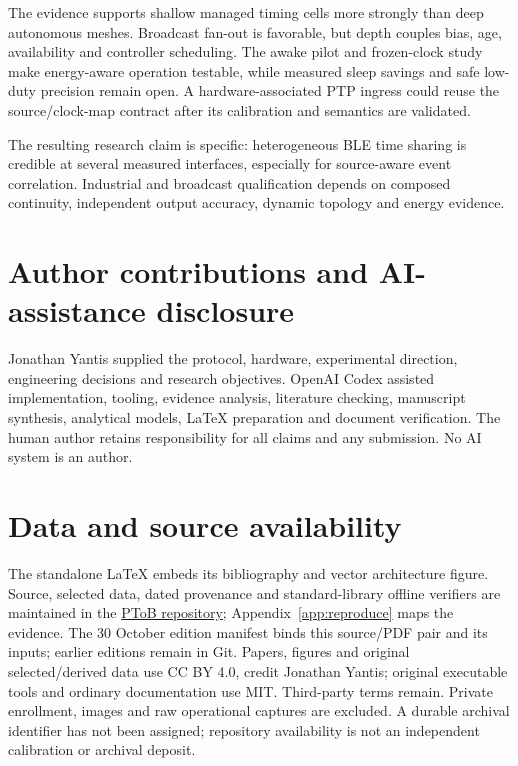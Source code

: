 \documentclass[11pt,letterpaper]{article}
\begin{document}
The evidence supports shallow managed timing cells more strongly than deep autonomous meshes. Broadcast fan-out is favorable, but depth couples bias, age, availability and controller scheduling. The awake pilot and frozen-clock study make energy-aware operation testable, while measured sleep savings and safe low-duty precision remain open. A hardware-associated PTP ingress could reuse the source/clock-map contract after its calibration and semantics are validated.

The resulting research claim is specific: heterogeneous BLE time sharing is credible at several measured interfaces, especially for source-aware event correlation. Industrial and broadcast qualification depends on composed continuity, independent output accuracy, dynamic topology and energy evidence.

\section*{Author contributions and AI-assistance disclosure}
Jonathan Yantis supplied the protocol, hardware, experimental direction, engineering decisions and research objectives. OpenAI Codex assisted implementation, tooling, evidence analysis, literature checking, manuscript synthesis, analytical models, LaTeX preparation and document verification. The human author retains responsibility for all claims and any submission. No AI system is an author.

\section*{Data and source availability}
The standalone LaTeX embeds its bibliography and vector architecture figure. Source, selected data, dated provenance and standard-library offline verifiers are maintained in the \href{https://github.com/yantisj2/PToB}{PToB repository}; Appendix~\ref{app:reproduce} maps the evidence. The 30 October edition manifest binds this source/PDF pair and its inputs; earlier editions remain in Git. Papers, figures and original selected/derived data use CC BY 4.0, credit Jonathan Yantis; original executable tools and ordinary documentation use MIT. Third-party terms remain. Private enrollment, images and raw operational captures are excluded. A durable archival identifier has not been assigned; repository availability is not an independent calibration or archival deposit.

\appendix
\end{document}
